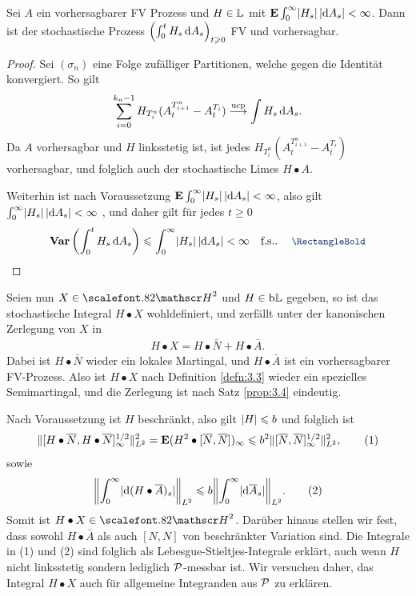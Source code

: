 \begin{lemma}
\label{lem:4.1}
Sei $A$ ein vorhersagbarer FV Prozess und $H\in\mathbb{L}$ mit
$\mathbf{E}\int_0^\infty \lvert H_s\rvert \,\lvert\mathrm{d} A_s\rvert < \infty$. Dann ist der
stochastische Prozess $\left( \int_0^t H_s\, \mathrm{d} A_s \right)_{t \geqslant 0}$ FV und
vorhersagbar.\fish
\end{lemma}
\begin{proof}
Sei $(\sigma_n)$ eine Folge zufälliger Partitionen, welche gegen die Identität
konvergiert. So gilt
\begin{align*}
\sum_{i=0}^{k_n-1} H_{T_i^n}(A_t^{T_{i+1}^n}-A_t^{T_i})\overset{\text{ucp}}{\longrightarrow} \int H_s\,\mathrm{d} A_s.
\end{align*}
Da $A$ vorhersagbar und $H$ linksstetig ist, ist jedes
$H_{T_i^n}(A_t^{T_{i+1}^n}-A_t^{T_i})$ vorhersagbar, und folglich auch der
stochastische Limes $H\bullet A$.

Weiterhin ist nach Voraussetzung
$\mathbf{E}\int_0^\infty \lvert H_s\rvert \,\lvert\mathrm{d} A_s\rvert < \infty$, also gilt $\int_0^\infty
\lvert H_s\rvert \,\lvert\mathrm{d} A_s\rvert < \infty$ \fs, und daher gilt für jedes $t\ge 0$
\begin{align*}
\Var\left(\int_0^t
H_s \,\dA_s\right) \le \int_0^\infty \abs{H_s}\,\abs{\dA_s} < \infty\quad
\fs.\qed
\end{align*}
\end{proof}

Seien nun $X\in\cH^2$ und $H\in\mathrm{b}\mathbb{L}$ gegeben, so ist das stochastische Integral
$H\bullet X$ wohldefiniert, und zerfällt unter der kanonischen Zerlegung von
$X$ in
\begin{align*}
H\bullet X = H\bullet \bar{N} + H\bullet \bar{A}.
\end{align*}
Dabei ist $H\bullet \bar{N}$ wieder ein lokales Martingal, und $H\bullet
\bar{A}$ ist ein vorhersagbarer FV-Prozess. Also ist $H\bullet X$ nach
Definition \ref{defn:3.3} wieder ein spezielles Semimartingal, und die Zerlegung
ist nach Satz \ref{prop:3.4} eindeutig.

Nach Voraussetzung ist $H$ beschränkt, also gilt $\lvert H\rvert\leqslant b$ und folglich ist
\begin{align*}
\lVert[H\bullet \overline{N},H\bullet \overline{N}]_\infty^{1/2}\rVert_{L^2}^2
= \mathbf{E} (H^2\bullet [\overline{N},\overline{N}])_\infty \leqslant
b^2 \lVert[\overline{N},\overline{N}]_\infty^{1/2}\rVert_{L^2}^2,\tag{1}
\end{align*}
sowie
\begin{align*}
\norm*{\int_0^\infty \abs{\diffd (H\bullet \bar{A})_s}}_{L^2}
\le b
\norm*{\int_0^\infty \abs{\diffd \bar{A}_s}}_{L^2}.\tag{2}
\end{align*}
Somit ist $H\bullet X\in\HH^2$. Darüber hinaus stellen wir fest, dass sowohl
$H\bullet \bar{A}$ als auch $[N,N]$ von beschränkter Variation sind. Die
Integrale in (1) und (2) sind folglich als Lebesgue-Stieltjes-Integrale
erklärt, auch wenn $H$ nicht linksstetig sondern lediglich $\mathcal{P}$-messbar ist.
Wir versuchen daher, das Integral $H\bullet X$ auch für allgemeine Integranden
aus $\mathcal{P}$ zu erklären.

